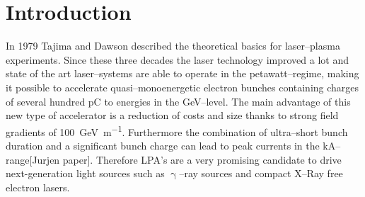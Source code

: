 \documentclass[%
preprint,
amsmath,
amssymb,
aip,
rsi, 
numerical,
floatfix,
]{revtex4-1}
\newcommand{\myCite}[1]{\textcolor{blue}{\cite{#1}}}
\begin{document}
\maketitle



\section{\label{Mot} Introduction}

In 1979 Tajima and Dawson described the theoretical basics for laser--plasma experiments\myCite{Tajima1979}.
Since these three decades the laser technology improved a lot and state of the art laser--systems are able to operate in the petawatt--regime\myCite{Gaul2010}, making it possible to accelerate quasi--monoenergetic\myCite{Geddes2004, Faure2004, Mangles2004} electron bunches containing charges of several hundred \si{\pico\coulomb} to energies in the \si{\giga\electronvolt}--level\myCite{Leemans2014, Schroeder2007, Wang2013}.
The main advantage of this new type of accelerator is a reduction of costs and size thanks to strong field gradients of \SI[per-mode=symbol]{100}{\giga\electronvolt\per\metre}\myCite{Esarey2009,Hooker2013}. 
Furthermore the combination of ultra--short bunch duration and a significant bunch charge can lead to peak currents in the \si{\kilo\ampere}--range[Jurjen paper]. 
Therefore LPA's are a very promising candidate to drive next-generation light sources such as $\upgamma$--ray sources\myCite{Sarri2014, TaPhuoc2012} and compact X--Ray free electron lasers\myCite{Schlenvoigt2008, Fuchs2009, Albert2014}.
 
\end{document}
